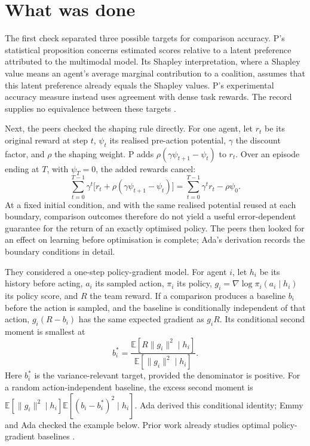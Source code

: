 \documentclass{article}
\begin{document}
\section{What was done}

The first check separated three possible targets for comparison accuracy. P's statistical proposition concerns estimated scores relative to a latent preference attributed to the multimodal model. Its Shapley interpretation, where a Shapley value means an agent's average marginal contribution to a coalition, assumes that this latent preference already equals the Shapley values. P's experimental accuracy measure instead uses agreement with dense task rewards. The record supplies no equivalence between these targets \cite{P}.

Next, the peers checked the shaping rule directly. For one agent, let \(r_t\) be its original reward at step \(t\), \(\psi_t\) its realised pre-action potential, \(\gamma\) the discount factor, and \(\rho\) the shaping weight. P adds \(\rho(\gamma\psi_{t+1}-\psi_t)\) to \(r_t\). Over an episode ending at \(T\), with \(\psi_T=0\), the added rewards cancel:
\[
\sum_{t=0}^{T-1}\gamma^t\bigl[r_t+\rho(\gamma\psi_{t+1}-\psi_t)\bigr]
=\sum_{t=0}^{T-1}\gamma^t r_t-\rho\psi_0.
\]
At a fixed initial condition, and with the same realised potential reused at each boundary, comparison outcomes therefore do not yield a useful error-dependent guarantee for the return of an exactly optimised policy. The peers then looked for an effect on learning before optimisation is complete; Ada's derivation records the boundary conditions in detail.

They considered a one-step policy-gradient model. For agent \(i\), let \(h_i\) be its history before acting, \(a_i\) its sampled action, \(\pi_i\) its policy, \(g_i=\nabla\log\pi_i(a_i\mid h_i)\) its policy score, and \(R\) the team reward. If a comparison produces a baseline \(b_i\) before the action is sampled, and the baseline is conditionally independent of that action, \(g_i(R-b_i)\) has the same expected gradient as \(g_iR\). Its conditional second moment is smallest at
\[
b_i^*=\frac{\mathbb E[R\lVert g_i\rVert^2\mid h_i]}
{\mathbb E[\lVert g_i\rVert^2\mid h_i]}.
\]
Here \(b_i^*\) is the variance-relevant target, provided the denominator is positive. For a random action-independent baseline, the excess second moment is \(\mathbb E[\lVert g_i\rVert^2\mid h_i]\mathbb E[(b_i-b_i^*)^2\mid h_i]\). Ada derived this conditional identity; Emmy and Ada checked the example below. Prior work already studies optimal policy-gradient baselines \cite{greensmith2004,settling2021}.
\end{document}

